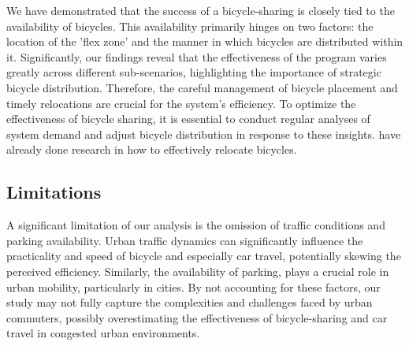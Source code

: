 We have demonstrated that the success of a bicycle-sharing is closely tied to the availability of bicycles.
This availability primarily hinges on two factors: the location of the 'flex zone' and the manner in which bicycles are distributed within it.
Significantly, our findings reveal that the effectiveness of the program varies greatly across different sub-scenarios, highlighting the importance of strategic bicycle distribution.
Therefore, the careful management of bicycle placement and timely relocations are crucial for the system's efficiency.
To optimize the effectiveness of bicycle sharing, it is essential to conduct regular analyses of system demand and adjust bicycle distribution in response to these insights.
 have already done research in how to effectively relocate bicycles.




\subsection{Limitations}
\label{sec:limitations}



A significant limitation of our analysis is the omission of traffic conditions and parking availability. 
Urban traffic dynamics can significantly influence the practicality and speed of bicycle and especially car travel, potentially skewing the perceived efficiency.
Similarly, the availability of parking, plays a crucial role in urban mobility, particularly in cities.
By not accounting for these factors, our study may not fully capture the complexities and challenges faced by urban commuters, possibly overestimating the effectiveness of bicycle-sharing and car travel in congested urban environments.

